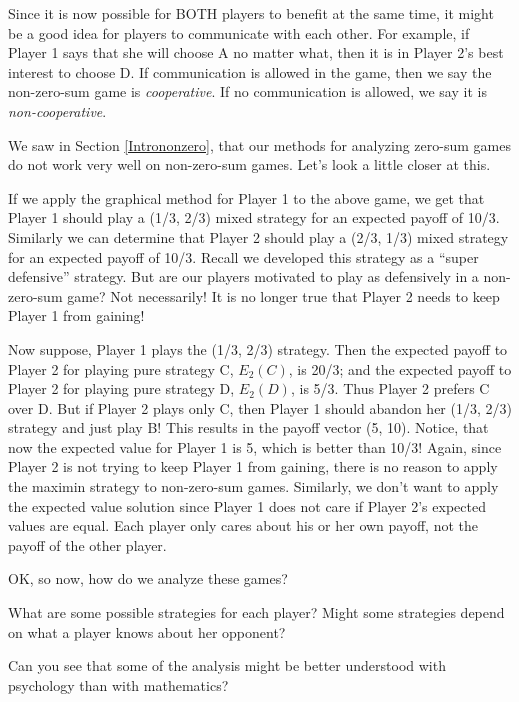 Since it is now possible for BOTH players to benefit at the same time, it might be a good idea for players to communicate with each other. For example, if Player 1 says that she will choose A no matter what, then it is in Player 2's best interest to choose D. If communication is allowed in the game, then we say the non-zero-sum game is \emph{cooperative}. If no communication is allowed, we say it is \emph{non-cooperative}. 

We saw in Section \ref{Intrononzero}, that our methods for analyzing zero-sum games do not work very well on non-zero-sum games. Let's look a little closer at this. 

If we apply the graphical method for Player 1 to the above game, we get that Player 1 should play a (1/3, 2/3) mixed strategy for an expected payoff of 10/3. Similarly we can determine that Player 2 should play a (2/3, 1/3) mixed strategy for an expected payoff of 10/3. Recall we developed this strategy as a ``super defensive'' strategy. But are our players motivated to play as defensively in a non-zero-sum game? Not necessarily! It is no longer true that Player 2 needs to keep Player 1 from gaining! 

Now suppose, Player 1 plays the (1/3, 2/3) strategy. Then the expected payoff to Player 2 for playing pure strategy C, $E_2(C)$, is 20/3; and the expected payoff to Player 2 for playing pure strategy D, $E_2(D)$, is 5/3. Thus Player 2 prefers C over D. But if Player 2 plays only C, then Player 1 should abandon her (1/3, 2/3) strategy and just play B! This results in the payoff vector (5, 10). Notice, that now the expected value for Player 1 is 5, which is better than 10/3! Again, since Player 2 is not trying to keep Player 1 from gaining, there is no reason to apply the maximin strategy to non-zero-sum games. Similarly, we don't want to apply the expected value solution since Player 1 does not care if Player 2's expected values are equal. Each player only cares about his or her own payoff, not the payoff of the other player.

OK, so now, how do we analyze these games? 

\begin{xca}\label{E:conjgeneralstrat}
What are some possible strategies for each player? Might some strategies depend on what a player knows about her opponent?
\end{xca}

Can you see that some of the analysis might be better understood with psychology than with mathematics? 



